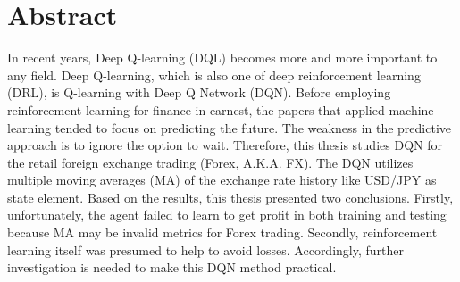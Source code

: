 \chapter*{Abstract}
\thispagestyle{empty}
In recent years, Deep Q-learning (DQL) becomes more and more important to any field. Deep Q-learning, which is also one of deep reinforcement learning (DRL), is Q-learning with Deep Q Network (DQN). Before employing reinforcement learning for finance in earnest, the papers that applied machine learning tended to focus on predicting the future. The weakness in the predictive approach is to ignore the option to wait. Therefore, this thesis studies DQN for the retail foreign exchange trading (Forex, A.K.A. FX). The DQN utilizes multiple moving averages (MA) of the exchange rate history like USD/JPY as state element. Based on the results, this thesis presented two conclusions. Firstly, unfortunately, the agent failed to learn to get profit in both training and testing because MA may be invalid metrics for Forex trading. Secondly, reinforcement learning itself was presumed to help to avoid losses. Accordingly, further investigation is needed to make this DQN method practical.

